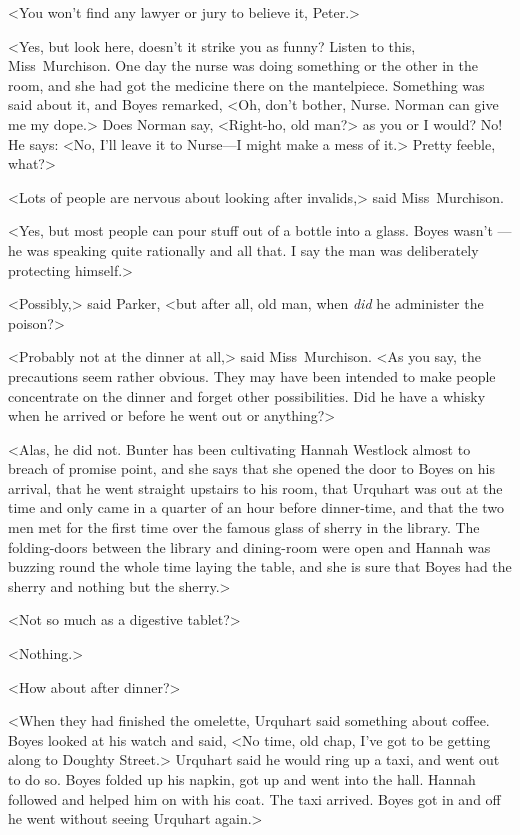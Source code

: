 <You won't find any lawyer or jury to believe it, Peter.>

<Yes, but look here, doesn't it strike you as funny? Listen to this, Miss~Murchison. One day the nurse was doing something or the other in the room, and she had got the medicine there on the mantelpiece. Something was said about it, and Boyes remarked, <Oh, don't bother, Nurse. Norman can give me my dope.> Does Norman say, <Right-ho, old man?> as you or I would? No! He says: <No, I'll leave it to Nurse—I might make a mess of it.> Pretty feeble, what?>

<Lots of people are nervous about looking after invalids,> said Miss~Murchison.

<Yes, but most people can pour stuff out of a bottle into a glass. Boyes wasn't —he was speaking quite rationally and all that. I say the man was deliberately protecting himself.>

<Possibly,> said Parker, <but after all, old man, when \emph{did} he administer the poison?>

<Probably not at the dinner at all,> said Miss~Murchison. <As you say, the precautions seem rather obvious. They may have been intended to make people concentrate on the dinner and forget other possibilities. Did he have a whisky when he arrived or before he went out or anything?>

<Alas, he did not. Bunter has been cultivating Hannah Westlock almost to breach of promise point, and she says that she opened the door to Boyes on his arrival, that he went straight upstairs to his room, that Urquhart was out at the time and only came in a quarter of an hour before dinner-time, and that the two men met for the first time over the famous glass of sherry in the library. The folding-doors between the library and dining-room were open and Hannah was buzzing round the whole time laying the table, and she is sure that Boyes had the sherry and nothing but the sherry.>

<Not so much as a digestive tablet?>

<Nothing.>

<How about after dinner?>

<When they had finished the omelette, Urquhart said something about coffee. Boyes looked at his watch and said, <No time, old chap, I've got to be getting along to Doughty Street.> Urquhart said he would ring up a taxi, and went out to do so. Boyes folded up his napkin, got up and went into the hall. Hannah followed and helped him on with his coat. The taxi arrived. Boyes got in and off he went without seeing Urquhart again.>

